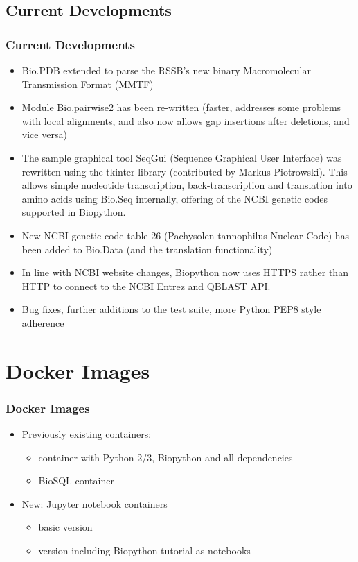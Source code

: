\documentclass[trans]{beamer}
\begin{document}
\subsection*{Current Developments}
\frame
{
  \frametitle{Current Developments}

  \begin{itemize}
  \item Bio.PDB extended to parse the RSSB's new binary Macromolecular
Transmission Format (MMTF)

  \item Module Bio.pairwise2 has been re-written (faster, addresses some problems with local alignments, and also now allows gap insertions after deletions, and vice versa)

  \item The sample graphical tool SeqGui (Sequence Graphical User Interface) was
rewritten using the tkinter library (contributed by Markus Piotrowski). This
allows simple nucleotide transcription, back-transcription and translation
into amino acids using Bio.Seq internally, offering of the NCBI genetic codes
supported in Biopython.

  \item New NCBI genetic code table 26 (Pachysolen tannophilus Nuclear Code) has been
added to Bio.Data (and the translation functionality)

  \item In line with NCBI website changes, Biopython now uses HTTPS rather than HTTP
to connect to the NCBI Entrez and QBLAST API.

  \item Bug fixes, further additions to the test suite, more Python PEP8 style adherence

  \end{itemize}
}


\section{Docker Images}
\frame
{
  \frametitle{Docker Images}

  \begin{itemize}
  \item Previously existing containers:
    \begin{itemize}
    \item container with Python 2/3, Biopython and all dependencies
    \item BioSQL container
  \end{itemize}
  \item New: Jupyter notebook containers
    \begin{itemize}
      \item basic version
      \item version including Biopython tutorial as notebooks
    \end{itemize}
  \end{itemize}
}
\end{document}
